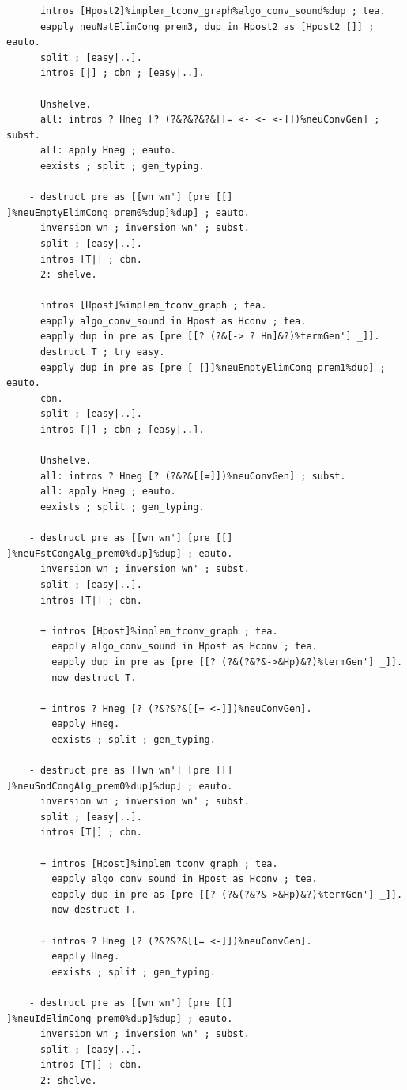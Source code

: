 \documentclass[10pt,a4paper]{amsart}
\begin{document}
\begin{lstlisting}
      intros [Hpost2]%implem_tconv_graph%algo_conv_sound%dup ; tea.
      eapply neuNatElimCong_prem3, dup in Hpost2 as [Hpost2 []] ; eauto.
      split ; [easy|..].
      intros [|] ; cbn ; [easy|..].

      Unshelve.
      all: intros ? Hneg [? (?&?&?&?&[[= <- <- <-]])%neuConvGen] ; subst.
      all: apply Hneg ; eauto.
      eexists ; split ; gen_typing.
    
    - destruct pre as [[wn wn'] [pre [[] ]%neuEmptyElimCong_prem0%dup]%dup] ; eauto.
      inversion wn ; inversion wn' ; subst.
      split ; [easy|..].
      intros [T|] ; cbn.
      2: shelve.

      intros [Hpost]%implem_tconv_graph ; tea.
      eapply algo_conv_sound in Hpost as Hconv ; tea.
      eapply dup in pre as [pre [[? (?&[-> ? Hn]&?)%termGen'] _]].
      destruct T ; try easy.
      eapply dup in pre as [pre [ []]%neuEmptyElimCong_prem1%dup] ; eauto.
      cbn.
      split ; [easy|..].
      intros [|] ; cbn ; [easy|..].

      Unshelve.
      all: intros ? Hneg [? (?&?&[[=]])%neuConvGen] ; subst.
      all: apply Hneg ; eauto.
      eexists ; split ; gen_typing.
    
    - destruct pre as [[wn wn'] [pre [[] ]%neuFstCongAlg_prem0%dup]%dup] ; eauto.
      inversion wn ; inversion wn' ; subst.
      split ; [easy|..].
      intros [T|] ; cbn.
      
      + intros [Hpost]%implem_tconv_graph ; tea.
        eapply algo_conv_sound in Hpost as Hconv ; tea.
        eapply dup in pre as [pre [[? (?&(?&?&->&Hp)&?)%termGen'] _]].
        now destruct T.

      + intros ? Hneg [? (?&?&?&[[= <-]])%neuConvGen].
        eapply Hneg.
        eexists ; split ; gen_typing.
    
    - destruct pre as [[wn wn'] [pre [[] ]%neuSndCongAlg_prem0%dup]%dup] ; eauto.
      inversion wn ; inversion wn' ; subst.
      split ; [easy|..].
      intros [T|] ; cbn.
      
      + intros [Hpost]%implem_tconv_graph ; tea.
        eapply algo_conv_sound in Hpost as Hconv ; tea.
        eapply dup in pre as [pre [[? (?&(?&?&->&Hp)&?)%termGen'] _]].
        now destruct T.

      + intros ? Hneg [? (?&?&?&[[= <-]])%neuConvGen].
        eapply Hneg.
        eexists ; split ; gen_typing.
    
    - destruct pre as [[wn wn'] [pre [[] ]%neuIdElimCong_prem0%dup]%dup] ; eauto.
      inversion wn ; inversion wn' ; subst.
      split ; [easy|..].
      intros [T|] ; cbn.
      2: shelve.


\end{lstlisting}
\end{document}
